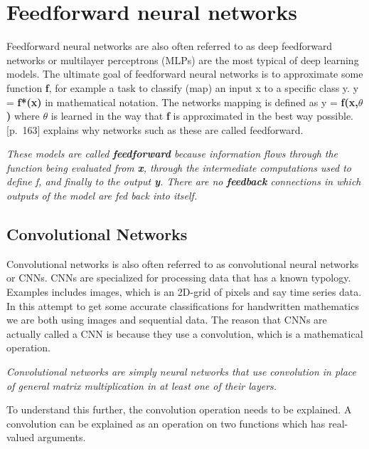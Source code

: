 \section{Feedforward neural networks}
% 
Feedforward neural networks are also often referred to as deep feedforward networks or multilayer perceptrons (MLPs) are the most typical of deep learning models. The ultimate goal of feedforward neural networks is to approximate some function \textbf{f}, for example a task to classify (map) an input x to a specific class y. y = \textbf{f*(x)} in mathematical notation. The networks mapping is defined as y = \textbf{f(x,$\theta$)} where $\theta$ is learned in the way that \textbf{f} is approximated in the best way possible. \\ 
\cite{goodfellow_deep_2016}[p.~163] explains why networks such as these are called feedforward.
\begin{displayquote}
\textit{These models are called \textbf{feedforward} because information flows through the function being evaluated from \textbf{x}, through the intermediate computations used to define f, and finally to the output \textbf{y}. There are no \textbf{feedback} connections in which outputs of the model are fed back into itself.}
\end{displayquote}

\subsection{Convolutional Networks}
% 
Convolutional networks \cite{lecun_generalization_1989} is also often referred to as convolutional neural networks or CNNs. CNNs are specialized for processing data that has a known typology. Examples includes images, which is an 2D-grid of pixels and say time series data. In this attempt to get some accurate classifications for handwritten mathematics we are both using images and sequential data. The reason that CNNs are actually called a CNN is because they use a convolution, which is a mathematical operation.
\begin{displayquote}
 \textit{Convolutional networks are simply neural networks that use convolution in place of general matrix multiplication in at least one of their layers.}
\end{displayquote}
To understand this further, the convolution operation needs to be explained. A convolution can be explained as an operation on two functions which has real-valued arguments.\\ 

